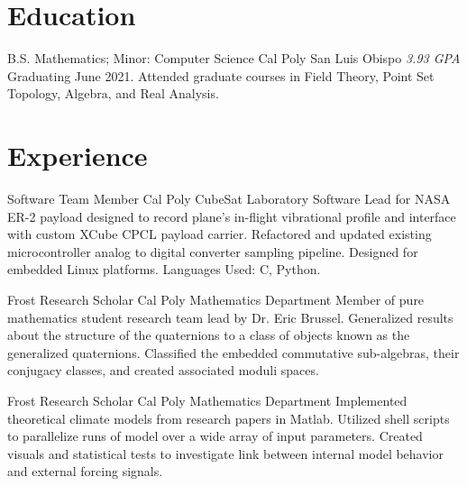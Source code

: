 \documentclass[a4paper, 11pt, sans]{moderncv}
\begin{document}
\makecvtitle

\section{Education}
        {B.S. Mathematics; Minor: Computer Science}
        {Cal Poly}
        {San Luis Obispo}
        {\textit{3.93 GPA}}
        {
            Graduating June 2021.\newline
            Attended graduate courses in Field Theory, Point Set Topology, Algebra, and Real Analysis. \newline
        }

\section{Experience}

        {Software Team Member}
        {Cal Poly CubeSat Laboratory}{}{}
        {
            Software Lead for NASA ER-2 payload designed to record plane's in-flight vibrational profile and interface with custom XCube CPCL payload carrier.\newline
            Refactored and updated existing microcontroller analog to digital converter sampling pipeline.
            Designed for embedded Linux platforms. Languages Used: C, Python.\newline
        }

        {Frost Research Scholar}
        {Cal Poly Mathematics Department}{}{}
        {
            Member of pure mathematics student research team lead by Dr. Eric Brussel.\newline
            Generalized results about the structure of the quaternions to a class of objects known as the generalized quaternions.\newline
            Classified the embedded commutative sub-algebras, their conjugacy classes, and created associated moduli spaces.\newline 
        }

        {Frost Research Scholar}
        {Cal Poly Mathematics Department}{}{}
        {
            Implemented theoretical climate models from research papers in Matlab.\newline
            Utilized shell scripts to parallelize runs of model over a wide array of input parameters.\newline
            Created visuals and statistical tests to investigate link between internal model behavior and external forcing signals.\newline 
        }
\end{document}
